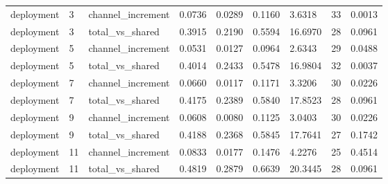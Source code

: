 {\begin{longtable}{lllllllll}
deployment & 3 & channel\_increment & 0.0736 & 0.0289 & 0.1160 & 3.6318 & 33 & 0.0013 \\
deployment & 3 & total\_vs\_shared & 0.3915 & 0.2190 & 0.5594 & 16.6970 & 28 & 0.0961 \\
deployment & 5 & channel\_increment & 0.0531 & 0.0127 & 0.0964 & 2.6343 & 29 & 0.0488 \\
deployment & 5 & total\_vs\_shared & 0.4014 & 0.2433 & 0.5478 & 16.9804 & 32 & 0.0037 \\
deployment & 7 & channel\_increment & 0.0660 & 0.0117 & 0.1171 & 3.3206 & 30 & 0.0226 \\
deployment & 7 & total\_vs\_shared & 0.4175 & 0.2389 & 0.5840 & 17.8523 & 28 & 0.0961 \\
deployment & 9 & channel\_increment & 0.0608 & 0.0080 & 0.1125 & 3.0403 & 30 & 0.0226 \\
deployment & 9 & total\_vs\_shared & 0.4188 & 0.2368 & 0.5845 & 17.7641 & 27 & 0.1742 \\
deployment & 11 & channel\_increment & 0.0833 & 0.0177 & 0.1476 & 4.2276 & 25 & 0.4514 \\
deployment & 11 & total\_vs\_shared & 0.4819 & 0.2879 & 0.6639 & 20.3445 & 28 & 0.0961 \\
\bottomrule
\end{longtable}}
